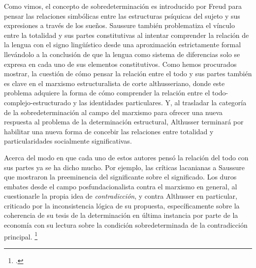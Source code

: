 Como vimos, el concepto de sobredeterminación es introducido por Freud para pensar las relaciones simbólicas entre las estructuras psíquicas del sujeto y sus expresiones a través de los sueños. Saussure también problematiza el vínculo entre la totalidad y sus partes constitutivas al intentar comprender la relación de la lengua con el signo lingüístico desde una aproximación estrictamente formal llevándolo a la conclusión de que la lengua como sistema de diferencias solo se expresa en cada uno de sus elementos constitutivos. Como hemos procurados mostrar, la cuestión de cómo pensar la relación entre el todo y sus partes también es clave en el marxismo estructuralista de corte althusseriano, donde este problema adquiere la forma de cómo comprender la relación entre el todo-complejo-estructurado y las identidades particulares. Y, al trasladar la categoría de la sobredeterminación al campo del marxismo para ofrecer una nueva respuesta al problema de la determinación estructural, Althusser terminará por habilitar una nueva forma de concebir las relaciones entre totalidad y particularidades socialmente significativas.

Acerca del modo en que cada uno de estos autores pensó la relación del todo con sus partes ya se ha dicho mucho. Por ejemplo, las críticas lacanianas a Saussure que mostraron la preeminencia del significante sobre el significado. Los duros embates desde el campo posfundacionalista contra el marxismo en general, al cuestionarle la propia idea de \emph{contradicción}, y contra Althusser en particular, criticado por la inconsistencia lógica de su propuesta, específicamente sobre la coherencia de su tesis de la determinación en última instancia por parte de la economía con su lectura sobre la condición sobredeterminada de la contradicción principal. \footcite[Por ejemplo,][133-136]{@7025-LACLAU2006}

